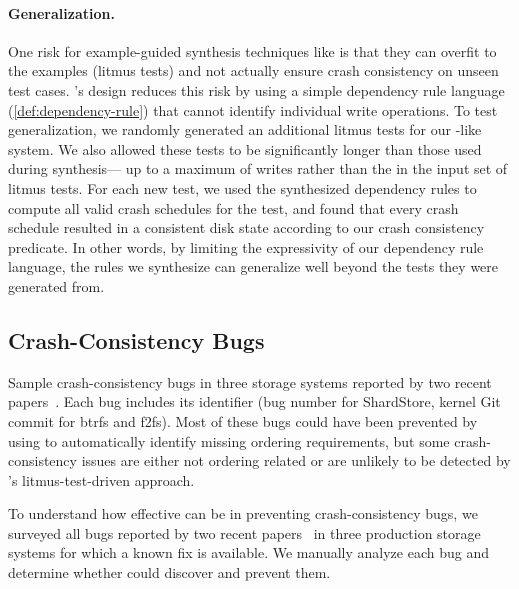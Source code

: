 \paragraph{Generalization.}
One risk for example-guided synthesis techniques like \depsynth
is that they can overfit to the examples (litmus tests)
and not actually ensure crash consistency on unseen test cases.
\depsynth's design reduces this risk
by using a simple dependency rule language (\cref{def:dependency-rule})
that cannot identify individual write operations.
To test generalization,
we randomly generated an additional \shardstoregeneralizationextratests{} litmus tests
for our \shardstore-like system.
We also allowed these tests to be significantly longer than those used during synthesis---%
up to a maximum of \shardstoregeneralizationmaxwrites{} writes
rather than the \shardstoremaxwrites{} in the input set of litmus tests.
For each new test,
we used the synthesized dependency rules
to compute all valid crash schedules for the test,
and found that every crash schedule resulted in a consistent disk state
according to our crash consistency predicate.
In other words, by limiting the expressivity of our dependency rule language,
the rules we synthesize can generalize well beyond the tests they were generated from.

\subsection{Crash-Consistency Bugs}\label{sec:eval:bugs}

\begin{table}
    \centering
    \caption{Sample crash-consistency bugs in three storage systems reported by two recent papers~\cite{bornholt:s3,mohan:crashmonkey}.
    Each bug includes its identifier (bug number for ShardStore, kernel Git commit for btrfs and f2fs).
    Most of these bugs could have been prevented by using \depsynth to automatically identify missing ordering requirements,
    but some crash-consistency issues are either not ordering related or are unlikely to be detected by \depsynth's litmus-test-driven approach.}
    {\xsmall}
    \label{fig:bugs}
\end{table}

To understand how effective \depsynth can be in preventing crash-consistency bugs,
we surveyed all bugs reported by two recent papers~\cite{bornholt:s3,mohan:crashmonkey}
in three production storage systems
for which a known fix is available.
We manually analyze each bug and determine whether \depsynth could discover and prevent them.

